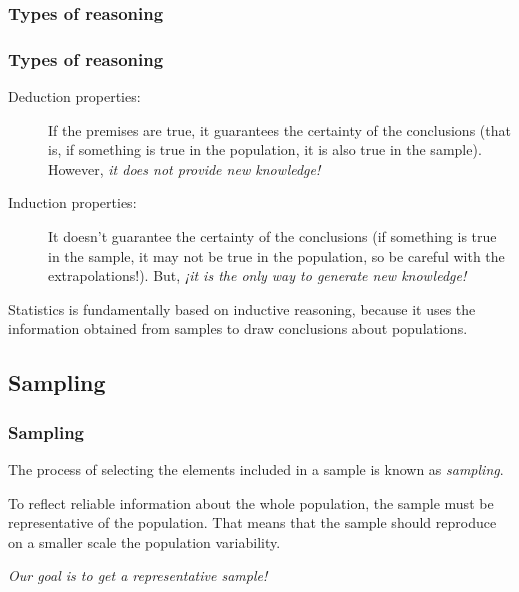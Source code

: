 \begin{frame}
\frametitle{Types of reasoning}

\begin{center}
\resizebox{0.5\textwidth}{!}{}
\end{center}
\end{frame}


\begin{frame}
\frametitle{Types of reasoning}
\begin{description}
\item [Deduction properties:] If the premises are true, it guarantees the certainty of the conclusions (that is, if
something is true in the population, it is also true in the sample). 
However, \alert{\emph{it does not provide new knowledge!}} 
\item [Induction properties:] It doesn't guarantee the certainty of the conclusions (if something is true in the
sample, it may not be true in the population, so be careful with the extrapolations!). 
But, \alert{\emph{¡it is the only way to generate new knowledge!}}
\end{description}

Statistics is fundamentally based on inductive reasoning, because it uses the information obtained from samples to
draw conclusions about populations.
\end{frame}


\subsection{Sampling}
\begin{frame}
\frametitle{Sampling}
\begin{definition}[Sampling]
The process of selecting the elements included in a sample is known as \emph{sampling}.
\end{definition}
\begin{center}
\resizebox{0.8\textwidth}{!}{}
\end{center}

To reflect reliable information about the whole population, the sample must be representative of the population.
That means that the sample should reproduce on a smaller scale the population variability.  

\begin{center}
\alert{\emph{Our goal is to get a representative sample!}}
\end{center}
\end{frame}


